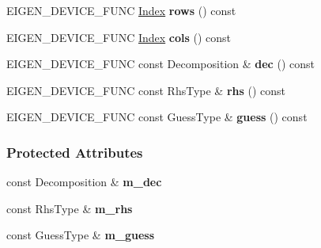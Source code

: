 \begin{DoxyCompactItemize}
\item 
\mbox{\label{group___iterative_linear_solvers___module_a24d826dd09bb375a5a171a4d7fea7238}} 
E\+I\+G\+E\+N\+\_\+\+D\+E\+V\+I\+C\+E\+\_\+\+F\+U\+NC \hyperlink{namespace_eigen_a62e77e0933482dafde8fe197d9a2cfde}{Index} {\bfseries rows} () const
\item 
\mbox{\label{group___iterative_linear_solvers___module_a8e557813e4cd841435a4004adc39ac58}} 
E\+I\+G\+E\+N\+\_\+\+D\+E\+V\+I\+C\+E\+\_\+\+F\+U\+NC \hyperlink{namespace_eigen_a62e77e0933482dafde8fe197d9a2cfde}{Index} {\bfseries cols} () const
\item 
\mbox{\label{group___iterative_linear_solvers___module_a1b6c66f5ae7156005a1d9c3034cabc88}} 
E\+I\+G\+E\+N\+\_\+\+D\+E\+V\+I\+C\+E\+\_\+\+F\+U\+NC const Decomposition \& {\bfseries dec} () const
\item 
\mbox{\label{group___iterative_linear_solvers___module_a4f67d806525d7a0468d3128fc6a14610}} 
E\+I\+G\+E\+N\+\_\+\+D\+E\+V\+I\+C\+E\+\_\+\+F\+U\+NC const Rhs\+Type \& {\bfseries rhs} () const
\item 
\mbox{\label{group___iterative_linear_solvers___module_a8192fcb557b83ddbf9a78783eeb931c1}} 
E\+I\+G\+E\+N\+\_\+\+D\+E\+V\+I\+C\+E\+\_\+\+F\+U\+NC const Guess\+Type \& {\bfseries guess} () const
\end{DoxyCompactItemize}
\subsubsection*{Protected Attributes}
\begin{DoxyCompactItemize}
\item 
\mbox{\label{group___iterative_linear_solvers___module_a845c47c835771577dd6923e006a5980c}} 
const Decomposition \& {\bfseries m\+\_\+dec}
\item 
\mbox{\label{group___iterative_linear_solvers___module_a285c507e63f8f01310984134acefd9ab}} 
const Rhs\+Type \& {\bfseries m\+\_\+rhs}
\item 
\mbox{\label{group___iterative_linear_solvers___module_a53cfdaf6536b46d74f794c4ffa909fc3}} 
const Guess\+Type \& {\bfseries m\+\_\+guess}
\end{DoxyCompactItemize}
